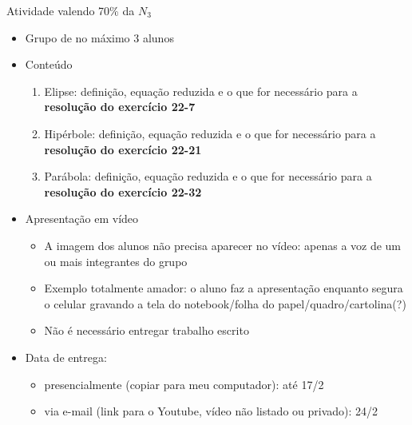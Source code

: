 \begin{frame}{Atividade valendo 70\% da \(N_3\)}
    \begin{itemize}
        \item Grupo de no máximo 3 alunos
        \item Conteúdo
            \begin{enumerate}
                \item Elipse: definição, equação reduzida e o que for necessário para a \textbf{resolução do exercício 22-7}
                \item Hipérbole: definição, equação reduzida e o que for necessário para a \textbf{resolução do exercício 22-21}
                \item Parábola: definição, equação reduzida e o que for necessário para a \textbf{resolução do exercício 22-32}
            \end{enumerate}
        \item Apresentação em vídeo
            \begin{itemize}
                \item A imagem dos alunos não precisa aparecer no vídeo:
                    apenas a voz de um ou mais integrantes do grupo
                \item Exemplo totalmente amador: o aluno faz a apresentação enquanto segura o celular 
                    gravando a tela do notebook/folha do papel/quadro/cartolina(?)
                \item Não é necessário entregar trabalho escrito
            \end{itemize}
        \item Data de entrega: 
            \begin{itemize}
                \item presencialmente (copiar para meu computador): até 17/2
                \item via e-mail (link para o Youtube, vídeo não listado ou privado): 24/2
            \end{itemize}

    \end{itemize}
\end{frame}


